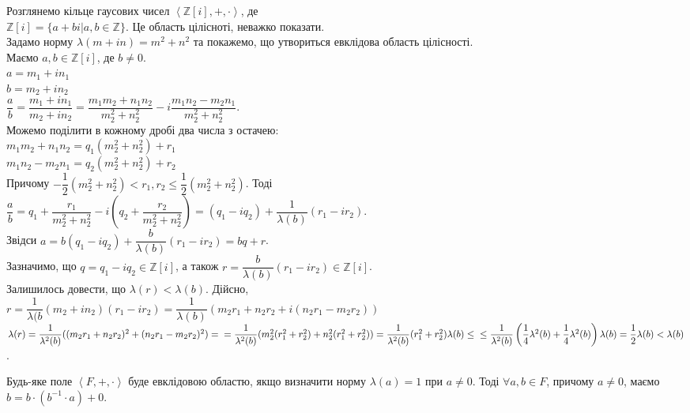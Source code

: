 \documentclass{math_library}
\begin{document}
\begin{example}
Розглянемо кільце гаусових чисел $\left< \mathbb{Z}[i], +, \cdot \right>$, де\\
$\mathbb{Z}[i] = \{ a+bi | a,b \in \mathbb{Z} \}$. Це область цілісноті, неважко показати.\\
Задамо норму $\lambda(m+in) = m^2 + n^2$ та покажемо, що утвориться евклідова область цілісності.\\
Маємо $a,b \in \mathbb{Z}[i]$, де $b \neq 0$.\\
$a = m_1 + in_1$\\
$b = m_2 + in_2$\\
$\dfrac{a}{b} = \dfrac{m_1+in_1}{m_2+in_2} = \dfrac{m_1m_2+n_1n_2}{m_2^2+n_2^2} - i \dfrac{m_1n_2 - m_2n_1}{m_2^2+n_2^2}$.\\
Можемо поділити в кожному дробі два числа з остачею:\\
$m_1m_2 + n_1n_2 = q_1(m_2^2+n_2^2) + r_1$\\
$m_1n_2 - m_2n_1 = q_2(m_2^2+n_2^2) + r_2$\\
Причому $-\dfrac{1}{2} (m_2^2+n_2^2) < r_1,r_2 \leq \dfrac{1}{2}(m_2^2+n_2^2)$. Тоді\\
$\dfrac{a}{b} = q_1 + \dfrac{r_1}{m_2^2 + n_2^2} - i \left( q_2 + \dfrac{r_2}{m_2^2+n_2^2} \right) = (q_1-iq_2) + \dfrac{1}{\lambda(b)}(r_1-ir_2)$.\\
Звідси $a = b(q_1-iq_2) + \dfrac{b}{\lambda(b)}(r_1-ir_2) = bq + r$.\\
Зазначимо, що $q = q_1-iq_2 \in \mathbb{Z}[i]$, а також $r = \dfrac{b}{\lambda(b)}(r_1-ir_2) \in \mathbb{Z}[i]$.\\
Залишилось довести, що $\lambda(r) < \lambda(b)$. Дійсно,\\
$r = \dfrac{1}{\lambda(b}(m_2+in_2)(r_1-ir_2) = \dfrac{1}{\lambda(b)}(m_2r_1+n_2r_2 + i(n_2r_1 - m_2r_2))$\\
$\lambda(r) = \dfrac{1}{\lambda^2(b)} ((m_2r_1+n_2r_2)^2 + (n_2r_1-m_2r_2)^2) = \\
= \dfrac{1}{\lambda^2(b)} (m_2^2(r_1^2+r_2^2) + n_2^2(r_1^2+r_2^2)) = \dfrac{1}{\lambda^2(b)} (r_1^2+r_2^2) \lambda(b) \leq \\ \leq \dfrac{1}{\lambda^2(b)} \left( \dfrac{1}{4}\lambda^2(b) + \dfrac{1}{4} \lambda^2(b) \right) \lambda(b) = \dfrac{1}{2} \lambda(b) < \lambda(b)$.
\end{example}

\begin{example}
Будь-яке поле $\left< F,+,\cdot\right>$ буде евклідовою областю, якщо визначити норму $\lambda(a) = 1$ при $a \neq 0$. Тоді $\forall a,b \in F$, причому $a \neq 0$, маємо $b = b \cdot (b^{-1} \cdot a) + 0$.
\end{example}
\end{document}
